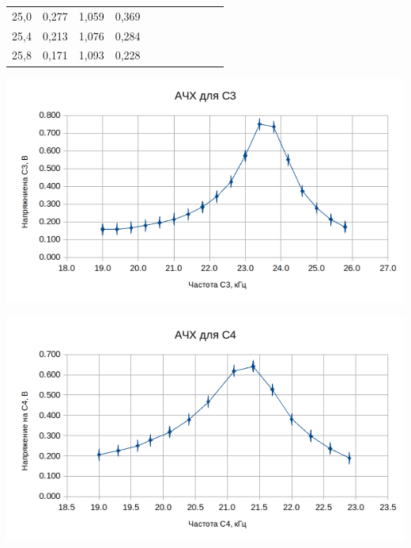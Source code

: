 \documentclass{article}
\begin{document}
\begin{center}
\begin{tabular}{|l|l|l|l|lllllll}
    25,0                        & 0,277                    & 1,059                       & 0,369                       &  &  &                       &                            &                            &                             &                             \\ \cline{1-4}
    25,4                        & 0,213                    & 1,076                       & 0,284                       &  &  &                       &                            &                            &                             &                             \\ \cline{1-4}
    25,8                        & 0,171                    & 1,093                       & 0,228                       &  &  &                       &                            &                            &                             &                             \\ \cline{1-4}
    \end{tabular}
\end{center}

\begin{center}
    \includegraphics[width = 16 cm]{ACH_3.png}
\end{center}

\begin{center}
    \includegraphics[width = 15 cm]{ACH_4.png}
\end{center}
\end{document}
